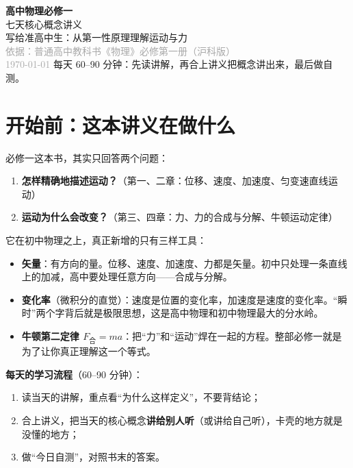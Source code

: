 \documentclass[UTF8,a4paper,11pt]{ctexart}
\begin{document}
\begin{center}
  \vspace*{2cm}
  {\Huge\bfseries\color{accent} 高中物理必修一}\\[0.4cm]
  {\LARGE 七天核心概念讲义}\\[1.2cm]
  {\large 写给准高中生：从第一性原理理解运动与力}\\[0.5cm]
  {\small\textcolor{darkgray}{依据：普通高中教科书《物理》必修第一册（沪科版）}}\\[0.3cm]
  {\small\textcolor{darkgray}{\today}}
  \vfill
  {\small 每天 60–90 分钟：先读讲解，再合上讲义把概念讲出来，最后做自测。}
\end{center}
\newpage

\tableofcontents
\newpage

\section*{开始前：这本讲义在做什么}

必修一这本书，其实只回答两个问题：

\begin{enumerate}
  \item \textbf{怎样精确地描述运动？}（第一、二章：位移、速度、加速度、匀变速直线运动）
  \item \textbf{运动为什么会改变？}（第三、四章：力、力的合成与分解、牛顿运动定律）
\end{enumerate}

它在初中物理之上，真正新增的只有三样工具：

\begin{keyconcept}[一周要带走的三样工具]
\begin{itemize}
  \item \textbf{矢量}：有方向的量。位移、速度、加速度、力都是矢量。初中只处理一条直线上的加减，高中要处理任意方向——合成与分解。
  \item \textbf{变化率}（微积分的直觉）：速度是位置的变化率，加速度是速度的变化率。“瞬时”两个字背后就是极限思想，这是高中物理和初中物理最大的分水岭。
  \item \textbf{牛顿第二定律 $F_{\text{合}}=ma$}：把“力”和“运动”焊在一起的方程。整部必修一就是为了让你真正理解这一个等式。
\end{itemize}
\end{keyconcept}

\textbf{每天的学习流程}（60–90 分钟）：
\begin{enumerate}
  \item 读当天的讲解，重点看“为什么这样定义”，不要背结论；
  \item 合上讲义，把当天的核心概念\textbf{讲给别人听}（或讲给自己听），卡壳的地方就是没懂的地方；
  \item 做“今日自测”，对照书末的答案。
\end{enumerate}
\end{document}
